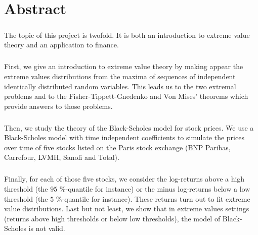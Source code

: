 

\cleardoublepage
\chapter*{Abstract}
\bigskip
\paragraph{}
The topic of this project is twofold. It is both an introduction to extreme value theory and an application to finance.
\paragraph{}
First, we give an introduction to extreme value theory by making appear the extreme values distributions from the maxima of sequences of independent identically distributed random variables. This leads us to the two extremal problems and to the Fisher-Tippett-Gnedenko and Von Mises' theorems which provide answers to those problems.
\paragraph{}
Then, we study the theory of the Black-Scholes model for stock prices. We use a Black-Scholes model with time independent coefficients to simulate the prices over time of five stocks listed on the Paris stock exchange (BNP Paribas, Carrefour, LVMH, Sanofi and Total). 
\paragraph{}
Finally, for each of those five stocks, we consider the log-returns above a high threshold (the $95$ \%-quantile for instance) or the minus log-returns below a low threshold (the $5$ \%-quantile for instance). These returns turn out to fit extreme value distributions. Last but not least, we show that in extreme values settings (returns above high thresholds or below low thresholds), the model of Black-Scholes is not valid.
\vskip0.5cm


